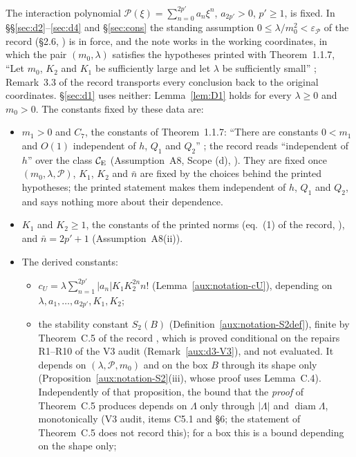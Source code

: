 The interaction polynomial $\mathscr P(\xi)=\sum_{n=0}^{2p'}a_n\xi^n$, $a_{2p'}>0$,
$p'\ge1$, is fixed. In \S\S\ref{sec:d2}--\ref{sec:d4} and \S\ref{sec:cons} the standing
assumption $0\le\lambda/m_0^2<\varepsilon_{\mathscr P}$ of the record (\S2.6,
\cite[p.~14]{R}) is in force, and the note works in the working coordinates, in which the
pair $(m_0,\lambda)$ satisfies the hypotheses printed with Theorem~1.1.7, ``Let $m_0$, $K_2$
and $K_1$ be sufficiently large and let $\lambda$ be sufficiently small'' \cite[p.~594]{GJS};
Remark~3.3 of the record \cite[p.~16]{R} transports every conclusion back to the original
coordinates. \S\ref{sec:d1} uses neither: Lemma~\ref{lem:D1} holds for every $\lambda\ge0$ and
$m_0>0$. The constants fixed by these data are:
\begin{itemize}
\item[(F1)] $m_1>0$ and $C_7$, the constants of Theorem~1.1.7: ``There are constants $0<m_1$
and $O(1)$ independent of $h$, $Q_1$ and $Q_2$'' \cite[p.~594]{GJS}; the record reads
``independent of $h$'' over the class $\mathcal{C}_{\mathrm E}$ (Assumption~A8, Scope (d), \cite[p.~13]{R}).
They are fixed once $(m_0,\lambda,\mathscr P)$, $K_1$, $K_2$ and $\bar n$ are fixed by the
choices behind the printed hypotheses; the printed statement makes them independent of $h$,
$Q_1$ and $Q_2$, and says nothing more about their dependence.
\item[(F2)] $K_1$ and $K_2\ge1$, the constants of the printed norms (eq.~(1) of the record,
\cite[p.~10]{R}), and $\bar n=2p'+1$ (Assumption~A8(ii)).
\item[(F3)] The derived constants:
\begin{itemize}
\item $c_U=\lambda\sum_{n=1}^{2p'}|a_n|K_1K_2^{2n}n!$ (Lemma~\ref{aux:notation-cU}),
depending on $\lambda,a_1,\dots,a_{2p'},K_1,K_2$;
\item the stability constant $S_2(B)$ (Definition~\ref{aux:notation-S2def}), finite by
Theorem~C.5 of the record \cite[p.~41]{R}, which is proved conditional on the repairs R1--R10
of the V3 audit (Remark~\ref{aux:d3-V3}), and not evaluated. It depends on $(\lambda,\mathscr P,m_0)$ and on the box $B$
through its shape only (Proposition~\ref{aux:notation-S2}(iii), whose proof uses Lemma~C.4).
Independently of that proposition, the bound that the \emph{proof} of Theorem~C.5 produces
depends on $\Lambda$ only through $|\Lambda|$ and $\operatorname{diam}\Lambda$, monotonically
(V3 audit, items C5.1 and \S6; the statement of Theorem~C.5 does not record this); for a box
this is a bound depending on the shape only;

\end{itemize}
\end{itemize}
